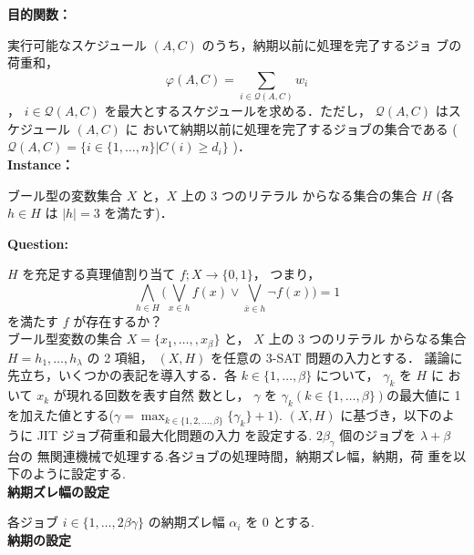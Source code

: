\documentclass[12pt]{optlab-bachelor}
\begin{document}
\noindent \textbf{目的関数：}

実行可能なスケジュール $(A, C)$ のうち，納期以前に処理を完了するジョ
ブの荷重和，
$$\displaystyle \varphi(A,C) = \sum_{i \in \mathcal{Q}(A,C)}w_i$$，
$i \in \mathcal{Q}(A,C)$ を最大とするスケジュールを求める．ただし，
$\mathcal{Q}(A, C)$ はスケジュール $(A, C)$ に
おいて納期以前に処理を完了するジョブの集合である (
$\mathcal{Q}(A, C) = \{i \in \{1,\ldots, n\} | C(i) \ge d_i \}$ )．\\

\noindent \textbf{Instance：}

ブール型の変数集合 $X$ と，$X$ 上の 3 つのリテラル
からなる集合の集合 $H$ (各 $h \in H$ は $|h| = 3$ を満たす)．

\noindent \textbf{Question:}

$H$ を充足する真理値割り当て $f ; X \to \{0,1\}$，
つまり，
$$\displaystyle \bigwedge_{h \in H} \bigg(\bigvee_{x \in h}f(x) \lor
\bigvee_{\bar x \in h}\lnot f(x) \bigg) = 1$$
を満たす $f$ が存在するか？\\

ブール型変数の集合 $X = \{x_1,\ldots,,x_β\}$ と， $X$ 上の 3 つのリテラル
からなる集合 $H = {h_1,\ldots,h_{\lambda}}$ の 2 項組， $(X,H)$ を任意の
3-SAT 問題の入力とする．
議論に先立ち，いくつかの表記を導入する．各 $k \in \{1,\ldots,\beta\}$
について， $\gamma_k$ を $H$ に おいて $x_k$ が現れる回数を表す自然
数とし， $\gamma$ を $\gamma_k ( k \in \{1,\ldots,\beta\} )$の最大値に
1 を加えた値とする($\displaystyle \gamma = \max_{k \in \{1,2,\ldots, \beta\}} \{\gamma_k \}+ 1$).
$(X, H)$ に基づき，以下のように JIT ジョブ荷重和最大化問題の入力
を設定する. $2\beta_{\gamma}$ 個のジョブを $\lambda + \beta$ 台の
無関連機械で処理する.各ジョブの処理時間，納期ズレ幅，納期，荷
重を以下のように設定する.\\

\noindent \textbf{納期ズレ幅の設定}

各ジョブ $i \in \{1,\ldots,2\beta \gamma\}$ の納期ズレ幅
$\alpha_i$ を 0 とする.\\

\noindent \textbf{納期の設定}
\end{document}

